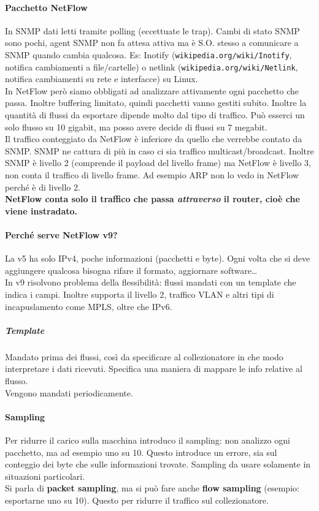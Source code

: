 \documentclass[10pt]{book}
\begin{document}
\paragraph{Pacchetto NetFlow} In SNMP dati letti tramite polling (eccettuate le trap). Cambi di stato SNMP sono pochi, agent SNMP non fa attesa attiva ma è S.O. stesso a comunicare a SNMP quando cambia qualcosa. Es: Inotify (\texttt{wikipedia.org/wiki/Inotify}, notifica cambiamenti a file/cartelle) o netlink (\texttt{wikipedia.org/wiki/Netlink}, notifica cambiamenti su rete e interfacce) su Linux.\\
In NetFlow però siamo obbligati ad analizzare attivamente ogni pacchetto che passa. Inoltre buffering limitato, quindi pacchetti vanno gestiti subito. Inoltre la quantità di flussi da esportare dipende molto dal tipo di traffico. Può esserci un solo flusso su 10 gigabit, ma posso avere decide di flussi su 7 megabit.\\
Il traffico conteggiato da NetFlow è inferiore da quello che verrebbe contato da SNMP. SNMP ne cattura di più in caso ci sia traffico multicast/broadcast. Inoltre SNMP è livello 2 (comprende il payload del livello frame) ma NetFlow è livello 3, non conta il traffico di livello frame. Ad esempio ARP non lo vedo in NetFlow perché è di livello 2.\\
\textbf{NetFlow conta solo il traffico che passa \textit{attraverso} il router, cioè che viene instradato.}
\paragraph{Perché serve NetFlow v9?} La v5 ha solo IPv4, poche informazioni (pacchetti e byte). Ogni volta che si deve aggiungere qualcosa bisogna rifare il formato, aggiornare software\ldots\\
In v9 risolvono problema della flessibilità: flussi mandati con un template che indica i campi. Inoltre supporta il livello 2, traffico VLAN e altri tipi di incapuslamento come MPLS, oltre che IPv6.
\subparagraph{Template} Mandato prima dei flussi, così da specificare al collezionatore in che modo interpretare i dati ricevuti. Specifica una maniera di mappare le info relative al flusso.\\
Vengono mandati periodicamente.
\paragraph{Sampling} Per ridurre il carico sulla macchina introduco il sampling: non analizzo ogni pacchetto, ma ad esempio uno su 10. Questo introduce un errore, sia sul conteggio dei byte che sulle informazioni trovate. Sampling da usare solamente in situazioni particolari.\\
Si parla di \textbf{packet sampling}, ma si può fare anche \textbf{flow sampling} (esempio: esportarne uno su 10). Questo per ridurre il traffico sul collezionatore.
\end{document}
